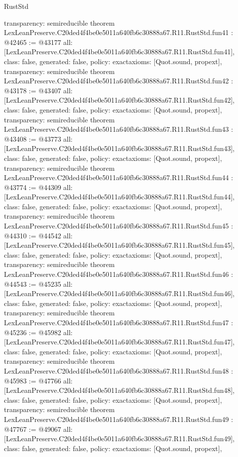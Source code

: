 \begin{lexlean}{RustStd}
\begin{coremodule}
{  transparency: semireducible
}
theorem LexLeanPreserve.C20ded4f4be0e5011a640fb6c30888a67.R11.RustStd.fun41 : @42465 := @43177 {
  all: [LexLeanPreserve.C20ded4f4be0e5011a640fb6c30888a67.R11.RustStd.fun41],
  class: false,
  generated: false,
  policy: exact{axioms: [Quot.sound, propext]},
  transparency: semireducible
}
theorem LexLeanPreserve.C20ded4f4be0e5011a640fb6c30888a67.R11.RustStd.fun42 : @43178 := @43407 {
  all: [LexLeanPreserve.C20ded4f4be0e5011a640fb6c30888a67.R11.RustStd.fun42],
  class: false,
  generated: false,
  policy: exact{axioms: [Quot.sound, propext]},
  transparency: semireducible
}
theorem LexLeanPreserve.C20ded4f4be0e5011a640fb6c30888a67.R11.RustStd.fun43 : @43408 := @43773 {
  all: [LexLeanPreserve.C20ded4f4be0e5011a640fb6c30888a67.R11.RustStd.fun43],
  class: false,
  generated: false,
  policy: exact{axioms: [Quot.sound, propext]},
  transparency: semireducible
}
theorem LexLeanPreserve.C20ded4f4be0e5011a640fb6c30888a67.R11.RustStd.fun44 : @43774 := @44309 {
  all: [LexLeanPreserve.C20ded4f4be0e5011a640fb6c30888a67.R11.RustStd.fun44],
  class: false,
  generated: false,
  policy: exact{axioms: [Quot.sound, propext]},
  transparency: semireducible
}
theorem LexLeanPreserve.C20ded4f4be0e5011a640fb6c30888a67.R11.RustStd.fun45 : @44310 := @44542 {
  all: [LexLeanPreserve.C20ded4f4be0e5011a640fb6c30888a67.R11.RustStd.fun45],
  class: false,
  generated: false,
  policy: exact{axioms: [Quot.sound, propext]},
  transparency: semireducible
}
theorem LexLeanPreserve.C20ded4f4be0e5011a640fb6c30888a67.R11.RustStd.fun46 : @44543 := @45235 {
  all: [LexLeanPreserve.C20ded4f4be0e5011a640fb6c30888a67.R11.RustStd.fun46],
  class: false,
  generated: false,
  policy: exact{axioms: [Quot.sound, propext]},
  transparency: semireducible
}
theorem LexLeanPreserve.C20ded4f4be0e5011a640fb6c30888a67.R11.RustStd.fun47 : @45236 := @45982 {
  all: [LexLeanPreserve.C20ded4f4be0e5011a640fb6c30888a67.R11.RustStd.fun47],
  class: false,
  generated: false,
  policy: exact{axioms: [Quot.sound, propext]},
  transparency: semireducible
}
theorem LexLeanPreserve.C20ded4f4be0e5011a640fb6c30888a67.R11.RustStd.fun48 : @45983 := @47766 {
  all: [LexLeanPreserve.C20ded4f4be0e5011a640fb6c30888a67.R11.RustStd.fun48],
  class: false,
  generated: false,
  policy: exact{axioms: [Quot.sound, propext]},
  transparency: semireducible
}
theorem LexLeanPreserve.C20ded4f4be0e5011a640fb6c30888a67.R11.RustStd.fun49 : @47767 := @49067 {
  all: [LexLeanPreserve.C20ded4f4be0e5011a640fb6c30888a67.R11.RustStd.fun49],
  class: false,
  generated: false,
  policy: exact{axioms: [Quot.sound, propext]},
}
\end{coremodule}
\end{lexlean}
